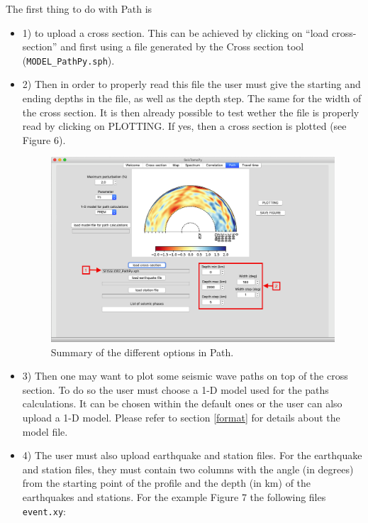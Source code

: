 \documentclass[12pt]{article}
\begin{document}
The first thing to do with Path is
\begin{itemize}
 \item 1) to upload a cross section. This
can be achieved by clicking on ``load cross-section'' and first using
a file generated by the Cross section tool (\verb?MODEL_PathPy.sph?).
\item 2) Then in order to
properly read this file the user must give the starting and ending
depths in the file, as well as the depth step. The same for the width of the
cross section. It is then already possible to test wether the file is
properly read by clicking on PLOTTING. If yes, then a cross section 
is plotted (see Figure 6).

\begin{figure}
\begin{center}
\includegraphics[scale=0.35]{SeisTomoPy_notebook/figures/pathpy1.png}
\caption{Summary of the different options in Path.}
\label{pathpy1}
\end{center}
\end{figure}

\item 3) Then one may want to plot  some seismic
wave paths on top of the cross section. To do so the user must choose a 1-D model used for the paths calculations. It can be chosen within the default ones or the user can also upload a 1-D model. Please refer to section \ref{format} for details about the model file.

\item 4) The user must also upload earthquake and station files. For the earthquake and station files,
they must contain two columns with the angle (in degrees) from the starting point of the profile and the depth
(in km) of the earthquakes and stations. For the example Figure 7 the following files \verb|event.xy|:


\end{itemize}
\end{document}
